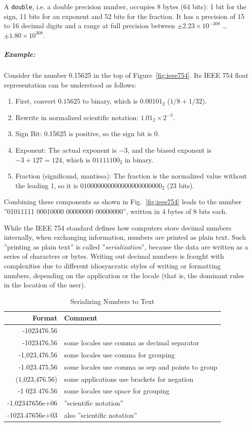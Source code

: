 A \texttt{double}, i.e. a double precision number, occupies 8 bytes (64 bits): 1 bit for the sign, 11 bits for an exponent and 52 bits for the fraction. It has a precision of 15 to 16 decimal digits and a range at full precision between $\pm 2.23 \times 10^{-308}$ \ldots $\pm 1.80 \times 10^{308}$. 

\subparagraph*{Example:} Consider the number 0.15625 in the top of Figure~\ref{fig:ieee754}. Its IEEE 754 float representation can be understood as follows:
\begin{enumerate}
	\item First, convert $0.15625$ to binary, which is $0.00101_2$ ($1/8+1/32$).
	\item Rewrite in normalized scientific notation: $1.01_2 \times 2^{-3}$.
	\item Sign Bit: 0.15625 is positive, so the sign bit is 0.
	\item Exponent: The actual exponent is $-3$, and the biased exponent is $-3+127=124$, which is $01111100_2$ in binary.
	\item Fraction (significand, mantissa): The fraction is the normalized value without the leading 1, so it is $010000000000000000000000_2$ (23 bits).
\end{enumerate}

Combining these components as shown in Fig.~\ref{fig:ieee754} leads to the number ''01011111 00010000 00000000 00000000'', written in 4 bytes of 8 bits each.

While the IEEE 754 standard defines how computers store decimal numbers internally, when exchanging information, numbers are printed as plain text. Such ''printing as plain text'' is called ''\emph{serialization}'', because the data are written as a series of characters or bytes. Writing out decimal numbers is fraught with complexities due to different idiosyncratic styles of writing or formatting numbers, depending on the application or the locale (that is, the dominant rules in the location of the user). 

\begin{table}[h]
\renewcommand{\arraystretch}{1.25}
\centering

\begin{tabular}{r|l} \hline
\textbf{Format} & \textbf{Comment} \\ \hline
-1023476.56 & \\
-1023476,56 & some locales use comma as decimal separator \\
-1,023,476.56 & some locales use comma for grouping \\
-1.023.475,56 & some locales use comma as sep and points to group \\
(1,023,476.56) & some applications use brackets for negation \\
-1 023 476.56 & some locales use space for grouping \\
-1.02347656e+06 & ''scientific notation'' \\
-1023.47656e+03 & also ''scientific notation'' \\ \hline
\end{tabular}
\caption{Serializing Numbers to Text}
\label{tab:floatingpointtext}
\end{table}

